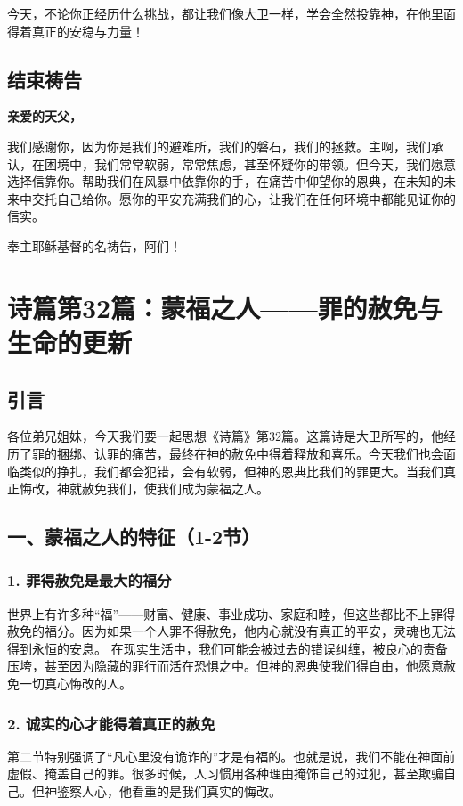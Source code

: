 \documentclass[a4paper, 12pt]{article}
\begin{document}
今天，不论你正经历什么挑战，都让我们像大卫一样，学会全然投靠神，在他里面得着真正的安稳与力量！

\subsection*{结束祷告}

\textbf{亲爱的天父，}

我们感谢你，因为你是我们的避难所，我们的磐石，我们的拯救。主啊，我们承认，在困境中，我们常常软弱，常常焦虑，甚至怀疑你的带领。但今天，我们愿意选择信靠你。帮助我们在风暴中依靠你的手，在痛苦中仰望你的恩典，在未知的未来中交托自己给你。愿你的平安充满我们的心，让我们在任何环境中都能见证你的信实。

奉主耶稣基督的名祷告，阿们！
\newpage
\section{诗篇第32篇：蒙福之人——罪的赦免与生命的更新}
\subsection*{引言}
各位弟兄姐妹，今天我们要一起思想《诗篇》第32篇。这篇诗是大卫所写的，他经历了罪的捆绑、认罪的痛苦，最终在神的赦免中得着释放和喜乐。今天我们也会面临类似的挣扎，我们都会犯错，会有软弱，但神的恩典比我们的罪更大。当我们真正悔改，神就赦免我们，使我们成为蒙福之人。

\subsection*{一、蒙福之人的特征（1-2节）}

\subsubsection*{1. 罪得赦免是最大的福分}
世界上有许多种“福”——财富、健康、事业成功、家庭和睦，但这些都比不上罪得赦免的福分。因为如果一个人罪不得赦免，他内心就没有真正的平安，灵魂也无法得到永恒的安息。
在现实生活中，我们可能会被过去的错误纠缠，被良心的责备压垮，甚至因为隐藏的罪行而活在恐惧之中。但神的恩典使我们得自由，他愿意赦免一切真心悔改的人。

\subsubsection*{2. 诚实的心才能得着真正的赦免}
第二节特别强调了“凡心里没有诡诈的”才是有福的。也就是说，我们不能在神面前虚假、掩盖自己的罪。很多时候，人习惯用各种理由掩饰自己的过犯，甚至欺骗自己。但神鉴察人心，他看重的是我们真实的悔改。
\end{document}
